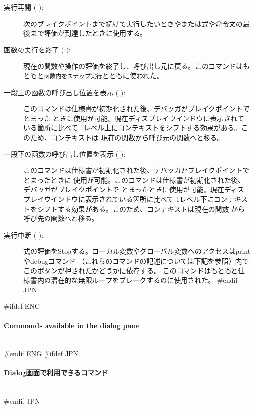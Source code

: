 \documentclass[\pformat,12pt]{article}
\newcommand{\subsubsubsection}[1]{\paragraph{#1}\mbox{}\\}
\newcommand{\guicmd}[1]{{\sf #1}}
\newcommand{\guicmd}[1]{{\gt #1}}
\begin{document}
\begin{description}
\item[\guicmd{実行再開} (\hspace{-1.8mm}
):] 
  次のブレイクポイントまで続けて実行したいときやまたは式や命令文の最後まで評価が到達したときに使用する。
  
\item[\guicmd{函数の実行を終了} (\hspace{-1.8mm}
):] 
  現在の関数や操作の評価を終了し、呼び出し元に戻る。このコマンドはもともと{\tt 函数内をステップ実行}とともに使われた。
  
\item[\guicmd{一段上の函数の呼び出し位置を表示} (\hspace{-1.8mm}
):] 
このコマンドは仕様書が初期化された後、デバッガがブレイクポイントでとまった
ときに使用が可能。現在ディスプレイウインドウに表示されている箇所に比べて
1レベル上にコンテキストをシフトする効果がある。このため、コンテキストは
現在の関数から呼び元の関数へと移る。

\item[\guicmd{一段下の函数の呼び出し位置を表示} (\hspace{-1.8mm}
):]
このコマンドは仕様書が初期化された後、デバッガがブレイクポイントでとまったときに
使用が可能。このコマンドは仕様書が初期化された後、デバッガがブレイクポイントで
とまったときに使用が可能。現在ディスプレイウインドウに表示されている箇所に比べて
1レベル下にコンテキストをシフトする効果がある。このため、コンテキストは現在の関数
から呼び先の関数へと移る。

\item[\guicmd{実行中断} (\hspace{-1.8mm}
):] 
  式の評価をStopする。ローカル変数やグローバル変数へのアクセスは\guicmd{print}や\guicmd{debug}コマンド
  （これらのコマンドの記述については下記を参照）内でこのボタンが押されたかどうかに依存する。
  このコマンドはもともと仕様書内の潜在的な無限ループをブレークするのに使用された。
#endif JPN
\end{description}

#ifdef ENG
\subsubsubsection{Commands available in the dialog pane}
#endif ENG
#ifdef JPN
\subsubsubsection{Dialog画面で利用できるコマンド}
#endif JPN
\end{document}
